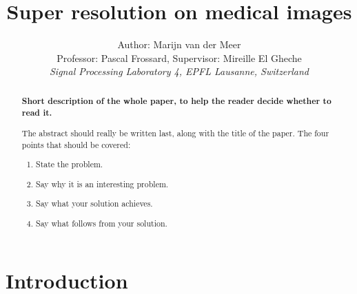 \documentclass[11pt,conference,compsocconf]{IEEEtran}
\begin{document}
\title{Super resolution on medical images}
\author{
  Author: Marijn van der Meer\\
  Professor: Pascal Frossard, Supervisor: Mireille El Gheche \\
  \textit{Signal Processing Laboratory 4, EPFL Lausanne, Switzerland}
}

\maketitle

\begin{abstract}
\textbf{ Short description of the whole paper, to help the
  reader decide whether to read it.}

The abstract should really be written last, along with the title of
the paper. The four points that should be covered:
\begin{enumerate}
\item State the problem.
\item Say why it is an interesting problem.
\item Say what your solution achieves.
\item Say what follows from your solution.
\end{enumerate}
 \end{abstract}

\section{Introduction}\label{sec:introduction}
\end{document}
